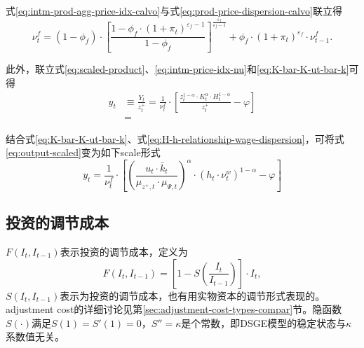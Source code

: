式\eqref{eq:intm-prod-agg-price-idx-calvo}与式\eqref{eq:prod-price-dispersion-calvo}联立得
\begin{equation}
  \label{eq:price-dispersion-index-iter}
  \nu_t^f = (1-\phi_f) \cdot
\left[\frac
{
  1-\phi_f \cdot (1+\pi_t)^{\varepsilon_f -1}
}
{
  1-\phi_f
}\right]^{\frac{\varepsilon_f}{\varepsilon_f-1}} + \phi_f \cdot (1+\pi_t)^{\varepsilon_f} \cdot \nu_{t-1}^f.
\end{equation}

此外，联立式\eqref{eq:scaled-product}、\eqref{eq:intm-price-idx-nu}和\eqref{eq:K-bar-K-ut-bar-k}可得
\begin{equation}
  \label{eq:output-scaled}
\begin{split}
  y_t &\equiv \frac{Y_t}{z_t^+} = \frac{1}{\nu_t^f} \cdot \left[ \frac{z_t^{1-\alpha} \cdot K_t^{\alpha} \cdot H_t^{1-\alpha}}{z_t^+} - \varphi \right] \\
  &=
\end{split}
\end{equation}

结合式\eqref{eq:K-bar-K-ut-bar-k}、式\eqref{eq:H-h-relationship-wage-dispersion}，可将式\eqref{eq:output-scaled}变为如下scale形式
\begin{equation}
y_t = \frac{1}{\nu^f_t} \cdot \left[
  \left(
  \frac{u_t \cdot \bar{k}_t}{\mu_{z^+,t} \cdot \mu_{\Psi,t}}
  \right)^{\alpha}
  \cdot
  \left(
  h_t \cdot \nu^w_t
  \right)^{1-\alpha}
  -\varphi
\right]
\end{equation}




\subsection{投资的调节成本}
\label{sec:adjustment-cost}
$F(I_t,I_{t-1})$表示投资的调节成本，定义为
\begin{equation}
  \label{eq:adjustment-cost-func-CEE}
  F(I_t,I_{t-1}) = \left[1-S\left( \frac{I_t}{I_{t-1}} \right) \right] \cdot I_t,
\end{equation}
$S(I_t,I_{t-1})$表示为投资的调节成本，也有用实物资本的调节形式表现的。adjustment cost的详细讨论见第\ref{sec:adjustment-cost-types-compar}节。隐函数$S(\cdot)$满足$S(1)=S'(1)=0$，$S''=\kappa$是个常数，即DSGE模型的稳定状态与$\kappa$系数值无关。



